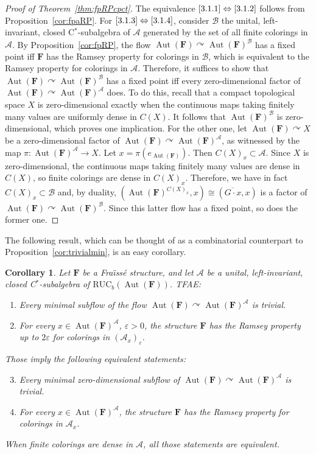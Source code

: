 \documentclass[11pt]{article}
\newtheorem{coro}[theo]{Corollary}
\theoremstyle{definition}
\numberwithin{equation}{section}
\numberwithin{figure}{section}
\numberwithin{table}{section}
\newcommand{\A}{\mathcal A}
\newcommand*{\mF}{\mathbf{F}}
\newcommand{\e}{\varepsilon}
\DeclareMathOperator{\Aut}{Aut}
\newcommand{\actson}{\curvearrowright}
\newcommand{\RUCB}{\mathrm{RUC}_{b}}
\begin{document}
\begin{proof}[Proof of Theorem~\ref{thm:fpRPcpct}]
The equivalence $\eqref{3.1.1}\Leftrightarrow \eqref{3.1.2}$ follows from Proposition~\ref{cor:fpaRP}. For $\eqref{3.1.3}\Leftrightarrow \eqref{3.1.4}$, consider $\mathcal B$ the unital, left-invariant, closed C$^{*}$-subalgebra of $\A$ generated by the set of all finite colorings in $\A$. By Proposition~\ref{cor:fpRP}, the flow $\Aut(\mF)\actson \Aut(\mF)^{\mathcal B}$ has a fixed point iff $\mF$ has the Ramsey property for colorings in $\mathcal B$, which is equivalent to the Ramsey property for colorings in $\A$. Therefore, it suffices to show that $\Aut(\mF)\actson \Aut(\mF)^{\mathcal B}$ has a fixed point iff every zero-dimensional factor of $\Aut(\mF)\actson \Aut(\mF)^{\mathcal A}$ does. To do this, recall that a compact topological space $X$ is zero-dimensional exactly when the continuous maps taking finitely many values are uniformly dense in $C(X)$. It follows that $\Aut(\mF)^{\mathcal B}$ is zero-dimensional, which proves one implication. For the other one, let $\Aut(\mF)\actson X$ be a zero-dimensional factor of $\Aut(\mF)\actson \Aut(\mF)^{\mathcal A}$, as witnessed by the map $\pi : \Aut(\mF)^{\A}\rightarrow X$. Let $x=\pi(e_{\Aut(\mF)})$. Then $C(X)_{x}\subset \A$. Since $X$ is zero-dimensional, the continuous maps taking finitely many values are dense in $C(X)$, so finite colorings are dense in $C(X)_{x}$. Therefore, we have in fact $C(X)_{x}\subset \mathcal B$ and, by duality, $(\Aut(\mF)^{C(X)_{x}},x)\cong (\overline{G\cdot x}, x)$ is a factor of $\Aut(\mF)\actson \Aut(\mF)^{\mathcal B}$. Since this latter flow has a fixed point, so does the former one.
\end{proof}

The following result, which can be thought of as a combinatorial counterpart to Proposition~\ref{cor:trivialmin}, is an easy corollary.

\begin{coro}\label{cor:fpRP'}
Let $\mF$ be a Fra\"{\i}ss\'e structure, and let $\A$ be a unital, left-invariant, closed C$^{*}$-subalgebra of $\RUCB(\Aut(\mF))$. TFAE:
\begin{enumerate}
\item \label{3.8.1} Every minimal subflow of the flow $\Aut(\mF)\actson \Aut(\mF)^{\A}$ is trivial.
\item \label{3.8.2} For every $x\in \Aut(\mF)^{\A}$, $\e>0$, the structure $\mF$ has the Ramsey property up to $2\e$ for colorings in $(\A_{x})_{\e}$.
\end{enumerate}

Those imply the following equivalent statements:
\begin{enumerate}
\setcounter{enumi}{2}
\item \label{3.8.3} Every minimal zero-dimensional subflow of $\Aut(\mF)\actson \Aut(\mF)^{\A}$ is trivial.
\item \label{3.8.4} For every $x\in \Aut(\mF)^{\A}$, the structure $\mF$ has the Ramsey property for colorings in $\A_{x}$.
\end{enumerate}

When finite colorings are dense in $\A$, all those statements are equivalent.
\end{coro}
\end{document}
